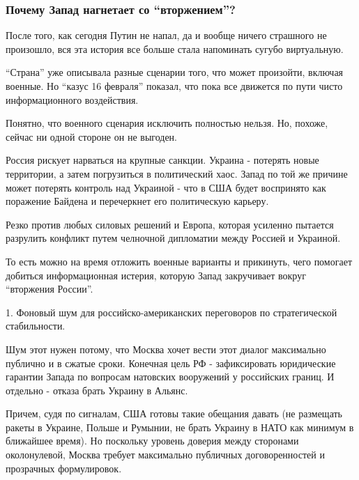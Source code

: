  
 
 
 
 

\subsubsection{Почему Запад нагнетает со \enquote{вторжением}?}
\label{sec:16_02_2022.stz.news.ua.strana.3.putin_ne_napal_infvojna.3.pochemu_zapad_nagnetaet}

После того, как сегодня Путин не напал, да и вообще ничего страшного не
произошло, вся эта история все больше стала напоминать сугубо виртуальную. 

\enquote{Страна} уже описывала разные сценарии того, что может произойти,
включая военные. Но \enquote{казус 16 февраля} показал, что пока все движется
по пути чисто информационного воздействия. 

Понятно, что военного сценария исключить полностью нельзя. Но, похоже, сейчас
ни одной стороне он не выгоден.

Россия рискует нарваться на крупные санкции. Украина - потерять новые
территории, а затем погрузиться в политический хаос. Запад по той же причине
может потерять контроль над Украиной - что в США будет воспринято как поражение
Байдена и перечеркнет его политическую карьеру. 

Резко против любых силовых решений и Европа, которая усиленно пытается
разрулить конфликт путем челночной дипломатии между Россией и Украиной. 

То есть можно на время отложить военные варианты и прикинуть, чего помогает
добиться информационная истерия, которую Запад закручивает вокруг
\enquote{вторжения России}. 

1. Фоновый шум для российско-американских переговоров по стратегической стабильности.

Шум этот нужен потому, что Москва хочет вести этот диалог максимально публично
и в сжатые сроки. Конечная цель РФ - зафиксировать юридические гарантии Запада
по вопросам натовских вооружений у российских границ. И отдельно - отказа брать
Украину в Альянс. 

Причем, судя по сигналам, США готовы такие обещания давать (не размещать ракеты
в Украине, Польше и Румынии, не брать Украину в НАТО как минимум в ближайшее
время). Но поскольку уровень доверия между сторонами околонулевой, Москва
требует максимально публичных договоренностей и прозрачных формулировок.

